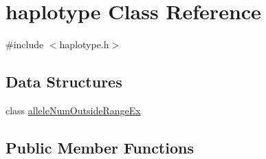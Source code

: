 \hypertarget{classhaplotype}{
\section{haplotype Class Reference}
\label{classhaplotype}
}


{\ttfamily \#include $<$haplotype.h$>$}

\subsection*{Data Structures}
\begin{DoxyCompactItemize}
\item 
class \hyperlink{classhaplotype_1_1alleleNumOutsideRangeEx}{alleleNumOutsideRangeEx}
\end{DoxyCompactItemize}
\subsection*{Public Member Functions}
